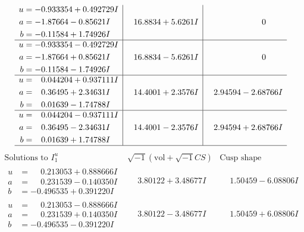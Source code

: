 \documentclass[1p]{elsarticle_modified}
\theoremstyle{definition}
\newcommand{\I}{\sqrt{-1}}
\begin{document}
$$\begin{array}{c|c|c}
\begin{aligned}
u &= -0.933354 + 0.492729 I \\
a &= -1.87664 - 0.85621 I \\
b &= -0.11584 + 1.74926 I\end{aligned}
 & \phantom{-}16.8834 + 5.6261 I & \phantom{-0.000000 } 0 \\ \hline\begin{aligned}
u &= -0.933354 - 0.492729 I \\
a &= -1.87664 + 0.85621 I \\
b &= -0.11584 - 1.74926 I\end{aligned}
 & \phantom{-}16.8834 - 5.6261 I & \phantom{-0.000000 } 0 \\ \hline\begin{aligned}
u &= \phantom{-}0.044204 + 0.937111 I \\
a &= \phantom{-}0.36495 + 2.34631 I \\
b &= \phantom{-}0.01639 - 1.74788 I\end{aligned}
 & \phantom{-}14.4001 + 2.3576 I & \phantom{-}2.94594 - 2.68766 I \\ \hline\begin{aligned}
u &= \phantom{-}0.044204 - 0.937111 I \\
a &= \phantom{-}0.36495 - 2.34631 I \\
b &= \phantom{-}0.01639 + 1.74788 I\end{aligned}
 & \phantom{-}14.4001 - 2.3576 I & \phantom{-}2.94594 + 2.68766 I\\
 \hline 
 \end{array}$$\newpage$$\begin{array}{c|c|c}  
\text{Solutions to }I^u_{1}& \I (\text{vol} + \sqrt{-1}CS) & \text{Cusp shape}\\
 \hline 
\begin{aligned}
u &= \phantom{-}0.213053 + 0.888666 I \\
a &= \phantom{-}0.231539 - 0.140350 I \\
b &= -0.496535 + 0.391220 I\end{aligned}
 & \phantom{-}3.80122 + 3.48677 I & \phantom{-}1.50459 - 6.08806 I \\ \hline\begin{aligned}
u &= \phantom{-}0.213053 - 0.888666 I \\
a &= \phantom{-}0.231539 + 0.140350 I \\
b &= -0.496535 - 0.391220 I\end{aligned}
 & \phantom{-}3.80122 - 3.48677 I & \phantom{-}1.50459 + 6.08806 I \\ \hline\begin{aligned}

\end{aligned}
\end{array}$$
\end{document}
